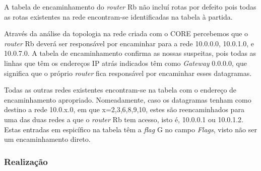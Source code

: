 \documentclass{llncs}
\begin{document}
A tabela de encaminhamento do \textit{router} Rb não incluí rotas por defeito pois todas as rotas existentes na rede encontram-se identificadas na tabela à partida.

Através da análise da topologia na rede criada com o CORE percebemos que o \textit{router} Rb deverá ser responsável por encaminhar para a rede 10.0.0.0, 10.0.1.0, e 10.0.7.0. A tabela de encaminhamento confirma as nossas suspeitas, pois todas as linhas que têm os endereços IP atrás indicados têm como \textit{Gateway} 0.0.0.0, que significa que o próprio \textit{router} fica responsável por encaminhar esses datagramas.

Todas as outras redes existentes encontram-se na tabela com o endereço de encaminhamento apropriado. Nomeadamente, caso os datagramas tenham como destino a rede 10.0.x.0, em que x={2,3,6,8,9,10}, estes são reencaminhados para uma das duas redes a que o \textit{router} Rb tem acesso, isto é, 10.0.0.1 ou 10.0.1.2. Estas entradas em espicífico na tabela têm a \textit{flag} G no campo \textit{Flags}, visto não ser um encaminhamento direto.

\subsubsection{Realização}\rule[-10pt]{0pt}{10pt}\\
\end{document}
